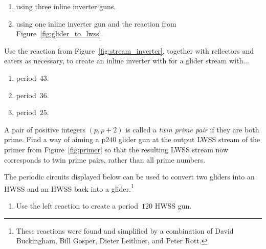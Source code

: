 \begin{multicols}{2}
\begin{problem}
	\begin{enumerate}[label=\bf\color{ocre}(\alph*)]
		\item using three inline inverter guns.
		
		\item using one inline inverter gun and the reaction from Figure~\ref{fig:glider_to_lwss}.
	\end{enumerate}
\end{problem}


\mfilbreak


\begin{problem}\label{exer:make_inline_inverter_with_weird_period}
	Use the reaction from Figure~\ref{fig:stream_inverter}, together with reflectors and eaters as necessary, to create an inline inverter with for a glider stream with...\smallskip
	
	\begin{enumerate}[label=\bf\color{ocre}(\alph*)]
		\item period~$43$.
		
		\item period~$36$.
		
		\item period~$25$.
	\end{enumerate}
\end{problem}


\mfilbreak


\begin{problem}\label{exer:twin_prime_gun}
	A pair of positive integers $(p,p+2)$ is called a \emph{twin prime pair} if they are both prime. Find a way of aiming a p$240$ glider gun at the output LWSS stream of the primer from Figure~\ref{fig:primer} so that the resulting LWSS stream now corresponds to twin prime pairs, rather than all prime numbers.
	
\end{problem}


\mfilbreak


\begin{problem}\label{exer:glider_to_hwss_to_glider}
	The periodic circuits displayed below can be used to convert two gliders into an HWSS and an HWSS back into a glider.\footnote{These reactions were found and simplified by a combination of David Buckingham, Bill Gosper, Dieter Leithner, and Peter Rott.}
	\begin{center}
	\end{center}
	\begin{enumerate}[label=\bf\color{ocre}(\alph*)]
		\item Use the left reaction to create a period~$120$ HWSS gun.
		

\end{enumerate}
\end{problem}
\end{multicols}
